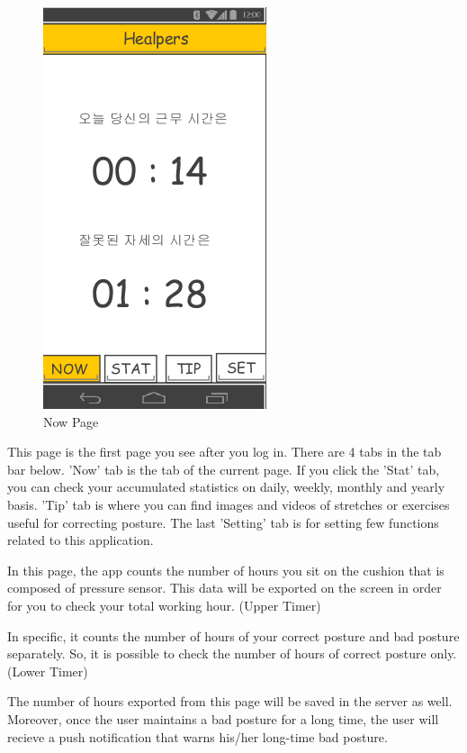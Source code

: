 \documentclass[conference]{IEEEtran}
\begin{document}
\begin{figure}[h]
\begin{center}
    \includegraphics[scale=1]{img_12}
    \caption{Now Page} 
\end{center}
\end{figure}

 This page is the first page you see after you log in. There are 4 tabs in the tab bar below. 'Now' tab is the tab of the current page. If you click the 'Stat' tab, you can check your accumulated statistics on daily, weekly, monthly  and yearly basis. 'Tip' tab is where you can find images and videos of stretches or exercises useful for correcting posture. The last 'Setting' tab is for setting few functions related to this application.

 In this page, the app counts the number of hours you sit on the cushion that is composed of pressure sensor. This data will be exported on the screen in order for you to check your total working hour. (Upper Timer)
 
In specific, it counts the number of hours of your correct posture and bad posture separately. So, it is possible to check the number of hours of correct posture only. (Lower Timer)

 The number of hours exported from this page will be saved in the server as well. Moreover, once the user maintains a bad posture for a long time, the user will recieve a push notification that warns his/her long-time bad  posture.\\
\end{document}
